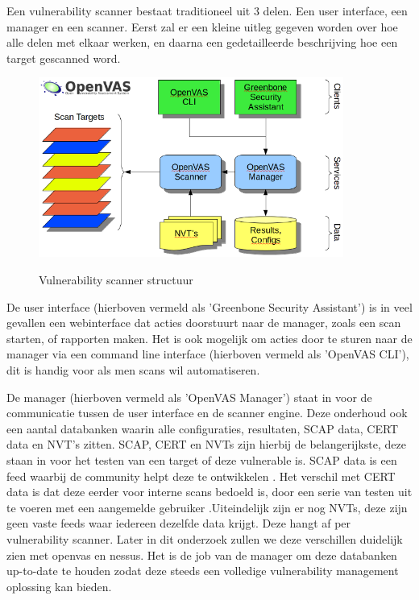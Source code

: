 
Een vulnerability scanner bestaat traditioneel uit 3 delen. Een user interface, een manager en een scanner. Eerst zal er een kleine uitleg gegeven worden over hoe alle delen met elkaar werken, en daarna een gedetailleerde beschrijving hoe een target gescanned word.

\begin{figure}[h]
\caption{Vulnerability scanner structuur}
\includegraphics[width=10.0cm]{img/Openvas-structuur.png} \textcite{Openvas-about}
\end{figure}
 
De user interface (hierboven vermeld als 'Greenbone Security Assistant') is in veel gevallen een webinterface dat acties doorstuurt naar de manager, zoals een scan starten, of rapporten maken. Het is ook mogelijk om acties door te sturen naar de manager via een command line interface (hierboven vermeld als 'OpenVAS CLI'), dit is handig voor als men scans wil automatiseren.

De manager (hierboven vermeld als 'OpenVAS Manager') staat in voor de communicatie tussen de user interface en de scanner engine. Deze onderhoud ook een aantal databanken waarin alle configuraties, resultaten, SCAP data, CERT data en NVT's zitten. SCAP, CERT en NVTs zijn hierbij de belangerijkste, deze staan in voor het testen van een target of deze vulnerable is. SCAP data is een feed waarbij de community helpt deze te ontwikkelen \textcite{whatis-scap}. Het verschil met CERT data is dat deze eerder voor interne scans bedoeld is, door een serie van testen uit te voeren met een aangemelde gebruiker \textcite{whatis-cert}.Uiteindelijk zijn er nog NVTs, deze zijn geen vaste feeds waar iedereen dezelfde data krijgt. Deze hangt af per vulnerability scanner. Later in dit onderzoek zullen we deze verschillen duidelijk zien met openvas en nessus. Het is de job van de manager om deze databanken up-to-date te houden zodat deze steeds een volledige vulnerability management oplossing kan bieden.

